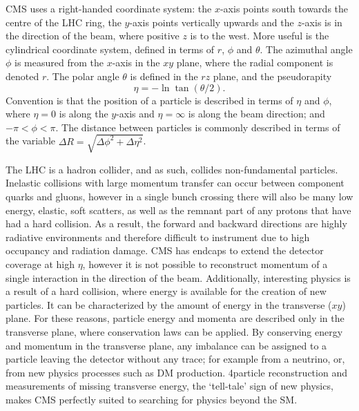 \ac{CMS} uses a right-handed coordinate system: the $x$-axis points south towards the centre of the \ac{LHC} ring, the $y$-axis points vertically upwards and the $z$-axis is in the direction of the beam, where positive $z$ is to the west.
More useful is the cylindrical coordinate system, defined in terms of $r$, $\phi$ and $\theta$.
The azimuthal angle $\phi$ is measured from the $x$-axis in the $xy$ plane, where the radial component is denoted $r$. The polar angle $\theta$ is defined in the $rz$ plane, and the pseudorapity 
\begin{equation}
\eta = - \ln \tan (\theta /2).
\end{equation}
Convention is that the position of a particle is described in terms of $\eta$ and $\phi$, where $\eta = 0$ is along the $y$-axis and $\eta = \infty $ is along the beam direction; and $-\pi < \phi < \pi$. The distance between particles is commonly described in terms of the variable $\Delta R = \sqrt{\Delta\phi^2+\Delta\eta^2}$.

The \ac{LHC} is a hadron collider, and as such, collides non-fundamental particles. 
Inelastic collisions with large momentum transfer can occur between component quarks and gluons, however in a single bunch crossing there will also be many low energy, elastic, soft scatters, 
as well as the remnant part of any protons that have had a hard collision. 
As a result, the forward and backward directions are highly radiative environments and therefore difficult to instrument due to high occupancy and radiation damage. 
\ac{CMS} has endcaps to extend the detector coverage at high $\eta$, however it is not possible to reconstruct momentum of a single interaction in the direction of the beam.   
Additionally, interesting physics is a result of a hard collision, where energy is available for the creation of new particles. It can be characterized by the amount of energy in the transverse ($xy$) plane.
For these reasons, particle energy and momenta are described only in the transverse plane, where conservation laws can be applied.
By conserving energy and momentum in the transverse plane, any imbalance can be assigned to a particle leaving the detector without any trace; for example from a neutrino, or, from new physics processes such as \ac{DM} production.
4\pi particle reconstruction and measurements of missing transverse energy, the `tell-tale' sign of new physics, makes \ac{CMS} perfectly suited to searching for physics beyond the \ac{SM}.


